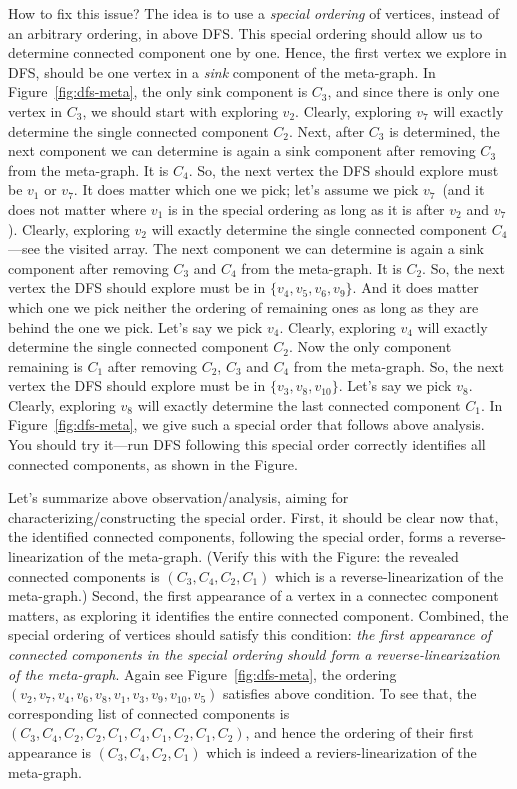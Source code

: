 How to fix this issue? The idea is to use a \emph{special ordering} of vertices, instead of an arbitrary ordering, in above DFS.
This special ordering should allow us to determine connected component one by one. Hence, the first vertex we explore in DFS,
should be one vertex in a \emph{sink} component of the meta-graph. In Figure~\ref{fig:dfs-meta}, the only sink component is $C_3$,
and since there is only one vertex in $C_3$, we should start with exploring $v_2$.
Clearly, exploring $v_7$ will exactly determine the single connected component $C_2$.
Next, after $C_3$ is determined, the next component we can determine is again a sink component after removing $C_3$ from the meta-graph.
It is $C_4$. So, the next vertex the DFS should explore must be $v_1$ or $v_7$. It does matter which one we pick; let's assume we pick $v_7$~(and it
does not matter where $v_1$ is in the special ordering as long as it is after $v_2$ and $v_7$).
Clearly, exploring $v_2$ will exactly determine the single connected component $C_4$---see the visited array.
The next component we can determine is again a sink component after removing $C_3$ and $C_4$ from the meta-graph.
It is $C_2$. So, the next vertex the DFS should explore must be in $\{v_4, v_5,v_6,v_9\}$. 
And it does matter which one we pick neither the ordering of remaining ones as long as they are behind the one we pick.
Let's say we pick $v_4$. Clearly, exploring $v_4$ will exactly determine the single connected component $C_2$.
Now the only component remaining is $C_1$ after removing $C_2$, $C_3$ and $C_4$ from the meta-graph.
So, the next vertex the DFS should explore must be in $\{v_3, v_8, v_{10}\}$. 
Let's say we pick $v_8$. Clearly, exploring $v_8$ will exactly determine the last connected component $C_1$.
In Figure~\ref{fig:dfs-meta}, we give such a special order that follows above analysis.
You should try it---run DFS following this special order correctly identifies all connected components, as shown in the Figure.

Let's summarize above observation/analysis, aiming for characterizing/constructing the special order.
First, it should be clear now that, the identified connected components,
following the special order, forms a reverse-linearization of the
meta-graph.  (Verify this with the Figure: the revealed connected components is
$(C_3, C_4, C_2, C_1)$ which is a reverse-linearization of the meta-graph.)
Second, the first appearance of a vertex in a connectec component matters, as exploring it identifies the entire connected component.
Combined, the special ordering of vertices should satisfy this condition:
\emph{the first appearance of connected components in the special ordering
should form a reverse-linearization of the meta-graph}.
Again see Figure~\ref{fig:dfs-meta}, the ordering 
$( v_{2} ,v_{7} ,v_{4} ,v_{6} ,v_{8} ,v_{1} ,v_{3} ,v_{9} ,v_{10} ,v_{5})$ satisfies above condition.
To see that, the corresponding list of connected components is 
$(C_3, C_4, C_2, C_2, C_1, C_4, C_1, C_2, C_1, C_2)$,
and hence the ordering of their first appearance is $(C_3, C_4, C_2, C_1)$ which is indeed a reviers-linearization of the meta-graph.


